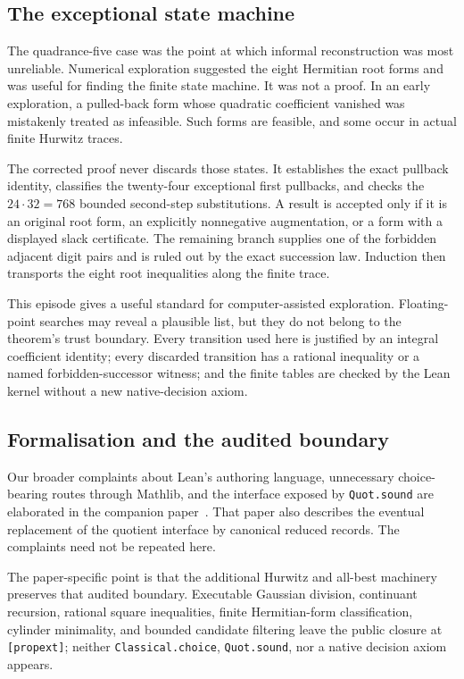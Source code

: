 \documentclass[11pt]{article}
\begin{document}
\subsection{The exceptional state machine}

The quadrance-five case was the point at which informal reconstruction was
most unreliable.  Numerical exploration suggested the eight Hermitian root
forms and was useful for finding the finite state machine.  It was not a
proof.  In an early exploration, a pulled-back form whose quadratic
coefficient vanished was mistakenly treated as infeasible.  Such forms are
feasible, and some occur in actual finite Hurwitz traces.

The corrected proof never discards those states.  It establishes the exact
pullback identity, classifies the twenty-four exceptional first pullbacks,
and checks the $24\cdot32=768$ bounded second-step substitutions.  A result is
accepted only if it is an original root form, an explicitly nonnegative
augmentation, or a form with a displayed slack certificate.  The remaining
branch supplies one of the forbidden adjacent digit pairs and is ruled out
by the exact succession law.  Induction then transports the eight root
inequalities along the finite trace.

This episode gives a useful standard for computer-assisted exploration.
Floating-point searches may reveal a plausible list, but they do not belong
to the theorem's trust boundary.  Every transition used here is justified by
an integral coefficient identity; every discarded transition has a rational
inequality or a named forbidden-successor witness; and the finite tables are
checked by the Lean kernel without a new native-decision axiom.

\subsection{Formalisation and the audited boundary}

Our broader complaints about Lean's authoring language, unnecessary
choice-bearing routes through Mathlib, and the interface exposed by
\texttt{Quot.sound} are elaborated in the companion paper~\cite{RFAPOne}.
That paper also describes the eventual replacement of the quotient interface
by canonical reduced records.  The complaints need not be repeated here.

The paper-specific point is that the additional Hurwitz and all-best
machinery preserves that audited boundary.  Executable Gaussian division,
continuant recursion, rational square inequalities, finite Hermitian-form
classification, cylinder minimality, and bounded candidate filtering leave
the public closure at \texttt{[propext]}; neither
\texttt{Classical.choice}, \texttt{Quot.sound}, nor a native decision axiom
appears.
\end{document}
